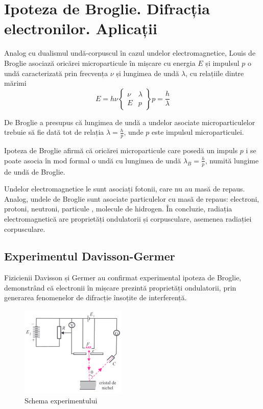\section{Ipoteza de Broglie. Difracția electronilor. Aplicații}

Analog cu dualismul undă-corpuscul în cazul undelor electromagnetice, Louis de Broglie asociază oricărei microparticule în mișcare cu energia $E$ și impulsul $p$ o undă caracterizată prin frecvența $\nu$ și lungimea de undă $\lambda$, cu relațiile dintre mărimi
\[
    E = h \nu
    \begin{Bmatrix}
        \nu & \lambda \\
        E   & p
    \end{Bmatrix}
    p = \frac{h}{\lambda}
\]

De Broglie a presupus că lungimea de undă a undelor asociate microparticulelor
trebuie să fie dată tot de relația \( \lambda = \frac{h}{p} \), unde $p$ este
impulsul microparticulei.

\parbreak

Ipoteza de Broglie afirmă că oricărei microparticule care posedă un impuls $p$
i se poate asocia în mod formal o undă cu lungimea de undă
\( \lambda_B = \frac{h}{p} \), numită lungime de undă de Broglie.

Undelor electromagnetice le sunt asociați fotonii, care nu au masă de repaus.
Analog, undele de Broglie sunt asociate particulelor cu masă de repaus:
electroni, protoni, neutroni, particule \alpha, molecule de hidrogen. În
concluzie, radiația electromagnetică are proprietăți ondulatorii și
corpusculare, asemenea radiației corpusculare.

\subsection{Experimentul Davisson-Germer}

Fizicienii Davisson și Germer au confirmat experimental ipoteza de Broglie,
demonstrând că electronii în mișcare prezintă proprietăți ondulatorii, prin
generarea fenomenelor de difracție însoțite de interferență.

\begin{figure}
    \includegraphics[width=0.45\textwidth]{fig/davisson_germer}
    \caption{Schema experimentului}
\end{figure}

